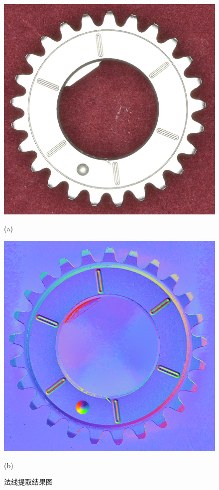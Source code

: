 \begin{figure}[htbp]
\centering
\begin{minipage}{0.48\linewidth}
\centerline{\includegraphics[width=1.0\linewidth]{figures/faxiantuyuantu.png}}
\centerline{(a)}
\end{minipage}
\begin{minipage}{0.48\linewidth}
\centerline{\includegraphics[width=1.0\linewidth]{figures/faxiantujieguo.png}}
\centerline{(b)}
\end{minipage}
\caption{法线提取结果图}
\label{fig:faxianjieguotu}
\end{figure}

